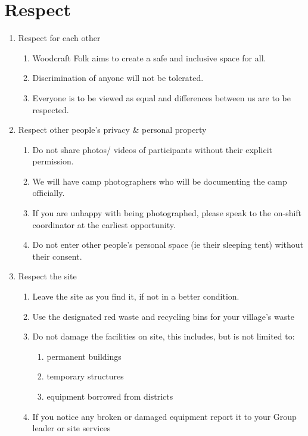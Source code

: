 \documentclass[a4paper, 11pt]{report}
\begin{document}
    \chapter{Respect}
    \begin{enumerate}
        \item Respect for each other
        \begin{enumerate}
            \item Woodcraft Folk aims to create a safe and inclusive space for all.
            \item Discrimination of anyone will not be tolerated.
            \item Everyone is to be viewed as equal and differences between us are to be respected. 
        \end{enumerate}
        \item Respect other people's privacy \& personal property
        \begin{enumerate}
            \item Do not share photos/ videos of participants without their explicit permission. 
            \item We will have camp photographers who will be documenting the camp officially. 
            \item If you are unhappy with being photographed, please speak to the on-shift coordinator at the earliest opportunity.
            \item Do not enter other people's personal space (ie their sleeping tent) without their consent.
        \end{enumerate}
        \item Respect the site
        \begin{enumerate}
            \item Leave the site as you find it, if not in a better condition.
            \item Use the designated red waste and recycling bins for your village's waste
            \item Do not damage the facilities on site, this includes, but is not limited to: 
            \begin{enumerate}
                \item permanent buildings
                \item temporary structures
                \item equipment borrowed from districts
            \end{enumerate}
            \item If you notice any broken or damaged equipment report it to your Group leader or site services

\end{enumerate}
\end{enumerate}
\end{document}
